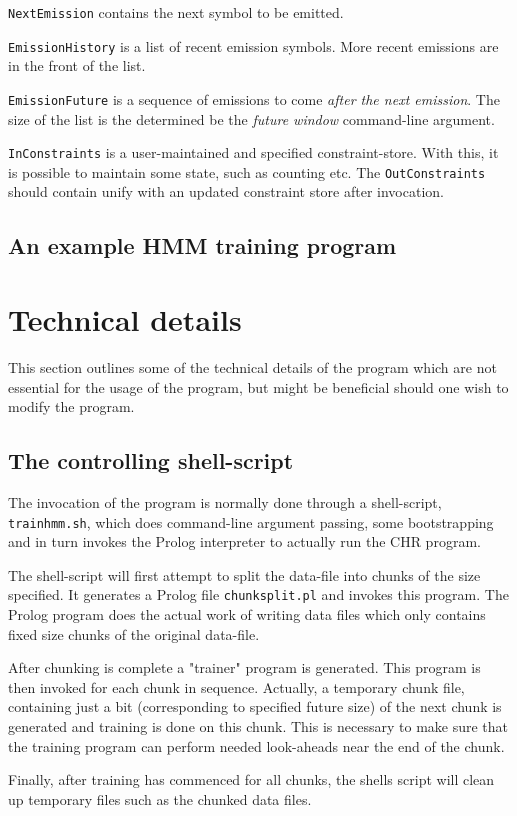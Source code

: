 \documentclass{article}
\begin{document}
\texttt{NextEmission} contains the next symbol to be emitted.

\texttt{EmissionHistory} is a list of recent emission symbols. More recent emissions are in the front of the list. 

\texttt{EmissionFuture} is a sequence of emissions to come \emph{after the next emission}. The size of the list is the determined be the \emph{future window} 
command-line argument.

\texttt{InConstraints} is a user-maintained and specified constraint-store. With this, it is possible to maintain some state, such as counting etc. The \texttt{OutConstraints} 
should contain unify with an updated constraint store after invocation.

\subsection{An example HMM training program}

\section{Technical details}

This section outlines some of the technical details of the program which are not essential for 
the usage of the program, but might be beneficial should one wish to modify the program.

\subsection{The controlling shell-script}

The invocation of the program is normally done through a shell-script, \texttt{trainhmm.sh}, which does command-line argument passing,
some bootstrapping and in turn invokes the Prolog interpreter to actually run the CHR program.

The shell-script will first attempt to split the data-file into chunks of the size specified.  It generates a Prolog file \texttt{chunksplit.pl} and invokes
this program. The Prolog program does the actual work of writing data files which only contains fixed size chunks of the original data-file.

After chunking is complete a "trainer" program is generated. This program is then invoked for each chunk in sequence. Actually, a temporary 
chunk file, containing just a bit (corresponding to specified future size) of the next chunk is generated and training is done on this chunk. This 
is necessary to make sure that the training program can perform needed look-aheads near the end of the chunk.

Finally, after training has commenced for all chunks, the shells script will clean up temporary files such as the chunked data files. 
\end{document}
